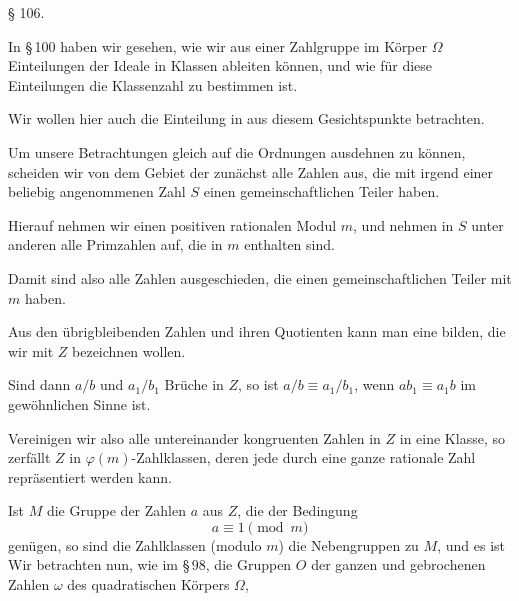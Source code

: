 \begin{center}
§ 106. 
\end{center}

In \S\,100 haben wir gesehen, wie wir aus einer Zahlgruppe
im Körper $\Omega$ Einteilungen der Ideale in Klassen ableiten können,
und wie für diese Einteilungen die Klassenzahl zu bestimmen ist.

Wir wollen hier auch die Einteilung in  aus
diesem Gesichtspunkte betrachten.

Um unsere Betrachtungen gleich auf die Ordnungen ausdehnen
 zu können, scheiden wir von dem Gebiet der  zunächst alle Zahlen aus, die mit irgend einer
beliebig angenommenen Zahl $S$ einen gemeinschaftlichen Teiler
haben.

Hierauf nehmen wir einen positiven rationalen Modul $m$, und
nehmen in $S$ unter anderen alle Primzahlen auf, die in $m$ enthalten
 sind.

Damit sind also alle Zahlen ausgeschieden, die einen gemeinschaftlichen
 Teiler mit $m$ haben.

Aus den übrigbleibenden Zahlen und ihren Quotienten
kann man eine  bilden, die wir mit
$Z$ bezeichnen wollen.


Sind dann $a/b$ und $a_1/b_1$ Brüche in $Z$, so ist $a/b \equiv a_1/b_1$,
wenn $ab_1 \equiv a_1 b$ im gewöhnlichen Sinne ist.

Vereinigen wir also alle untereinander kongruenten Zahlen
in $Z$ in eine Klasse, so zerfällt $Z$ in $\varphi(m)$-Zahlklassen, deren
jede durch eine ganze rationale Zahl repräsentiert werden kann.

Ist $M$ die Gruppe der Zahlen $a$ aus $Z$, die der Bedingung
\[
a \equiv 1 \pmod m
\]
genügen, so sind die Zahlklassen (modulo $m$) die Nebengruppen
zu $M$, und es ist
Wir betrachten nun, wie im \S\,98, die Gruppen $O$ der ganzen
und gebrochenen Zahlen $\omega$ des quadratischen Körpers $\Omega$, 
